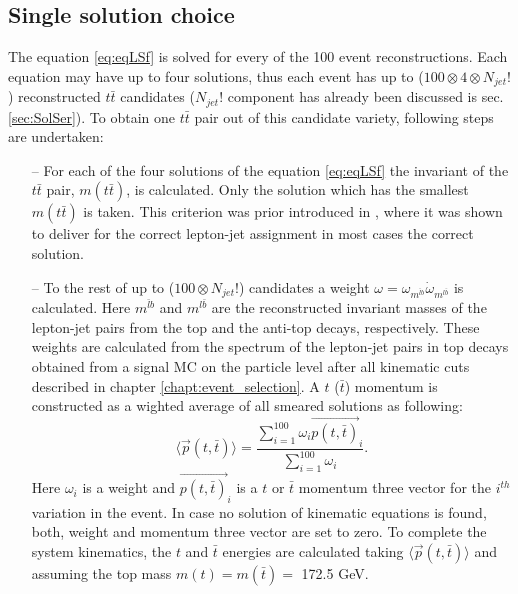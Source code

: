 \subsection{Single solution choice}

The equation \ref{eq:eqLSf} is solved for every of the 100 event reconstructions. Each equation may have up to four solutions, thus each event
has up to ($100 \otimes 4 \otimes N_{jet}!$) reconstructed $t\bar{t}$ candidates ($N_{jet}!$ component has already been discussed is sec. \ref{sec:SolSer}). 
To obtain one $t\bar{t}$ pair out of this candidate variety, following steps are undertaken:

\begin{itemize}
 \item [--] For each of the four solutions of the equation \ref{eq:eqLSf} the invariant of the $t\bar{t}$ pair, $m(t\bar{t})$, is calculated. Only
 the solution which has the smallest $m(t\bar{t})$ is taken. This criterion was prior introduced in \cite{PhysRevD.73.112006}, where it was shown to
 deliver for the correct lepton-jet assignment in most cases the correct solution.
 \item [--] To the rest of up to ($100 \otimes N_{jet}!$) candidates a weight $\omega = \omega_{m^{\bar{l}b}} \dot \omega_{m^{l\bar{b}}}$
 is calculated. Here $m^{\bar{l}b}$ and $m^{l\bar{b}}$ are the reconstructed invariant masses of the lepton-jet pairs from the top and the anti-top 
 decays, respectively. These weights are calculated from the spectrum of the lepton-jet pairs in top decays obtained from a signal MC on the 
 particle level after all kinematic cuts described in chapter \ref{chapt:event_selection}. A $t$ ($\bar{t}$) momentum is constructed as a wighted 
 average of all smeared solutions as following:
 \begin{equation}
  \langle{\vec{p}(t,\bar{t})}\rangle = \frac{\sum\limits_{i=1}^{100} \omega_{i} \vec{p(t,\bar{t})}_i}{\sum\limits_{i=1}^{100} \omega_i}.
 \end{equation}
 Here $\omega_i$ is a weight and $\vec{p(t, \bar{t})}_{i}$ is a $t$ or $\bar{t}$ momentum three vector for the $i^{th}$ variation in the event. 
 In case no solution of kinematic equations is found, both, weight and momentum three vector are set to zero. To complete the system kinematics,
 the $t$ and $\bar{t}$ energies are calculated taking $\langle{\vec{p}(t,\bar{t})}\rangle$ and assuming the top mass $m(t) = m(\bar{t}) = $ 172.5 GeV.
\end{itemize}

